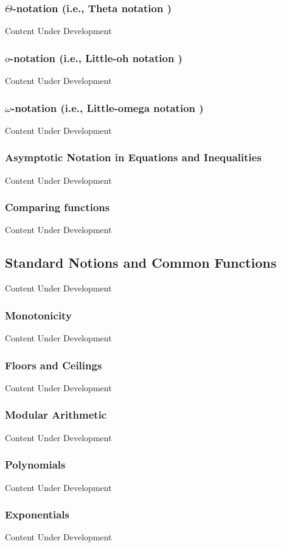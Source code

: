 \documentclass[12pt,a4paper]{book}
\begin{document}
\subsubsection{$\Theta$-notation (i.e., Theta notation )}
{\color{red} Content Under Development}
\subsubsection{$o$-notation (i.e., Little-oh notation )}
{\color{red} Content Under Development}
\subsubsection{$\omega$-notation (i.e., Little-omega notation )}
{\color{red} Content Under Development}
\subsubsection{Asymptotic Notation in Equations and Inequalities}
{\color{red} Content Under Development}
\subsubsection{Comparing functions}
{\color{red} Content Under Development}
\subsection{Standard Notions and Common Functions}
{\color{red} Content Under Development}
\subsubsection{Monotonicity}
{\color{red} Content Under Development}
\subsubsection{Floors and Ceilings}
{\color{red} Content Under Development}
\subsubsection{Modular Arithmetic}
{\color{red} Content Under Development}
\subsubsection{Polynomials}
{\color{red} Content Under Development}
\subsubsection{Exponentials}
{\color{red} Content Under Development}
\end{document}
